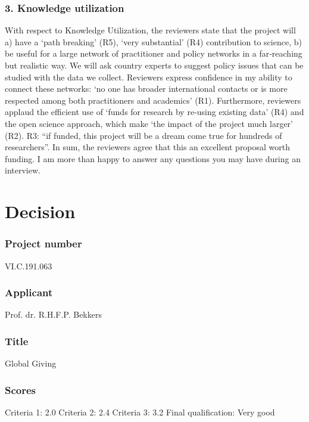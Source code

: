 \documentclass[twocolumn, serif, rga, numeric]{jote-article}
\begin{document}
\subsubsection{3. Knowledge utilization}
With respect to Knowledge Utilization, the reviewers state that the project will a) have a ‘path breaking’ (R5), ‘very substantial’ (R4) contribution to science, b) be useful for a large network of practitioner and policy networks in a far‐reaching but realistic way. We will ask country experts to suggest policy issues that can be studied with the data we collect. Reviewers express confidence in my ability to connect these networks: ‘no one has broader international contacts or is more respected among both practitioners and academics’ (R1). Furthermore, reviewers applaud the efficient use of ‘funds for research by re‐using existing data’ (R4) and the open science approach, which make ‘the impact of the project much larger’ (R2). R3: “if funded, this project will be a dream come true for hundreds of researchers”.
In sum, the reviewers agree that this an excellent proposal worth funding. I am more than happy to answer any questions you may have during an interview.

\section{Decision}
\subsubsection{Project number}
VI.C.191.063
\subsubsection{Applicant}
Prof. dr. R.H.F.P. Bekkers
\subsubsection{Title}
Global Giving
\subsubsection{Scores}
Criteria 1: 2.0
Criteria 2: 2.4
Criteria 3: 3.2
Final qualification: Very good
\end{document}
